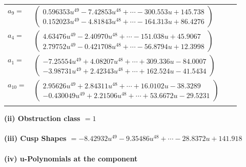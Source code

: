 \documentclass[1p]{elsarticle_modified}
\theoremstyle{definition}
\begin{document}
\begin{tabular}{m{7pt} m{180pt} m{7pt} m{180pt} }
\flushright $a_{9}=$&$\begin{pmatrix}0.596353 u^{49}-7.42853 u^{48}+\cdots-300.553 u+145.738\\0.152023 u^{49}-4.81843 u^{48}+\cdots-164.313 u+86.4276\end{pmatrix}$ \\
\flushright $a_{4}=$&$\begin{pmatrix}4.63476 u^{49}-2.40970 u^{48}+\cdots-151.038 u+45.9067\\2.79752 u^{49}-0.421708 u^{48}+\cdots-56.8794 u+12.3998\end{pmatrix}$ \\
\flushright $a_{1}=$&$\begin{pmatrix}-7.25554 u^{49}+4.08207 u^{48}+\cdots+309.336 u-84.0007\\-3.98731 u^{49}+2.42343 u^{48}+\cdots+162.524 u-41.5434\end{pmatrix}$ \\
\flushright $a_{10}=$&$\begin{pmatrix}2.95626 u^{49}+2.84311 u^{48}+\cdots+16.0102 u-38.3289\\-0.430049 u^{49}+2.21506 u^{48}+\cdots+53.6672 u-29.5231\end{pmatrix}$\\&\end{tabular}
\flushleft \textbf{(ii) Obstruction class $= 1$}\\~\\
\flushleft \textbf{(iii) Cusp Shapes $= -8.42932 u^{49}-9.35486 u^{48}+\cdots-28.8372 u+141.918$}\\~\\
\newpage\renewcommand{\arraystretch}{1}
\flushleft \textbf{(iv) u-Polynomials at the component}\newline \\
\end{document}
